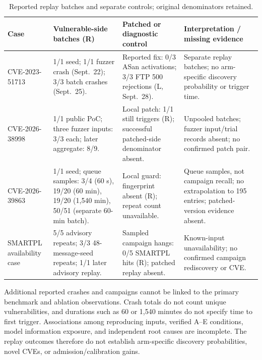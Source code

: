 \begin{table}[!tbp]
\centering\small
\caption{Reported replay batches and separate controls; original denominators retained.}
\label{tab:cveresults}
\begin{tabularx}{\textwidth}{@{}>{\raggedright\arraybackslash}p{} Y Y Y@{}}
\toprule
Case & Vulnerable-side batches (R) & Patched or diagnostic control & Interpretation / missing evidence \\
\midrule
\mbox{CVE-2023-51713} & 1/1 seed; 1/1 fuzzer crash (Sept.~22); 3/3 batch crashes (Sept.~25). & Reported fix: 0/3 ASan activations; 3/3 FTP 500 rejections (L, Sept.~28). & Separate replay batches; no arm-specific discovery probability or trigger time. \\
\addlinespace[3pt]
\mbox{CVE-2026-38998} & 1/1 public PoC; three fuzzer inputs: 3/3 each; later aggregate: 8/9. & Local patch: 1/1 still triggers (R); successful patched-side denominator absent. & Unpooled batches; fuzzer input/trial records absent; no confirmed patch pair. \\
\addlinespace[3pt]
\mbox{CVE-2026-39863} & 1/1 seed; queue samples: 3/4 (60 s), 19/20 (60 min), 19/20 (1,540 min), 50/51 (separate 60-min batch). & Local guard: fingerprint absent (R); repeat count unavailable. & Queue samples, not campaign recall; no extrapolation to 195 entries; patched-version evidence absent. \\
\addlinespace[3pt]
SMARTPL availability case & 5/5 advisory repeats; 3/3 48-message-seed repeats; 1/1 later advisory replay. & Sampled campaign hangs: 0/5 SMARTPL hits (R); patched replay absent. & Known-input unavailability; no confirmed campaign rediscovery or CVE. \\
\bottomrule
\end{tabularx}
\end{table}

Additional reported crashes and campaigns cannot be linked to the primary benchmark and ablation observations. Crash totals do not count unique vulnerabilities, and durations such as 60 or 1,540 minutes do not specify time to first trigger. Associations among reproducing inputs, verified A--E conditions, model information exposure, and independent root causes are incomplete. The replay outcomes therefore do not establish arm-specific discovery probabilities, novel CVEs, or admission/calibration gains.

